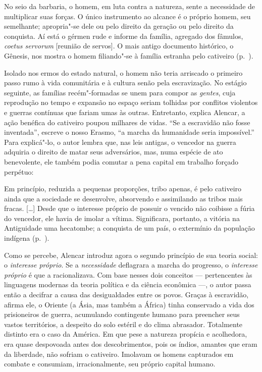 \begin{hedraquote}
No seio da barbaria, o homem, em luta contra a natureza, sente a
necessidade de multiplicar suas forças. O único instrumento ao alcance
é o próprio homem, seu semelhante; apropria"-se dele ou pelo direito
da geração ou pelo direito da conquista. Aí está o gérmen rude e
informe da família, agregado dos fâmulos, \textit{coetus servorum}
[reunião de servos]. O mais antigo documento histórico, o Gênesis, nos
mostra o homem filiando"-se à  família estranha pelo cativeiro
(p.~\pageref{barbaria}). 
\end{hedraquote}

Isolado nos ermos do estado natural, o homem não teria arriscado o
primeiro passo rumo à  vida comunitária e à  cultura senão pela
escravização. No estágio seguinte, as famílias recém"-formadas se unem
para compor as \textit{gentes}, cuja reprodução no tempo e expansão no
espaço seriam tolhidas por conflitos violentos e guerras contínuas que
fariam umas às outras. Entretanto, explica Alencar, a ação benéfica do
cativeiro poupou milhares de vidas. ``Se a escravidão não fosse
inventada'', escreve o nosso Erasmo, ``a marcha da humanidade seria
impossível.'' Para explicá"-lo, o autor lembra que, nas leis antigas, o
vencedor na guerra adquiria o direito de matar seus adversários, mas,
numa espécie de ato benevolente, ele também podia comutar a pena
capital em trabalho forçado perpétuo: 

\begin{hedraquote}
Em princípio, reduzida a pequenas proporções, tribo apenas, é pelo
cativeiro ainda que a sociedade se desenvolve, absorvendo e assimilando
as tribos mais fracas. [\ldots] 
Desde que o interesse próprio de possuir o vencido não coibisse a fúria
do vencedor, ele havia de imolar a vítima. Significara, portanto, a
vitória na Antiguidade uma hecatombe; a conquista de um país, o
extermínio da população indígena (p.~\pageref{hecatombe}). 
\end{hedraquote}

Como se percebe, Alencar introduz agora o segundo princípio de sua
teoria social: o \textit{interesse próprio}. Se a \textit{necessidade}
deflagrara a marcha do progresso, o \textit{interesse próprio} é que a
racionalizava. Com base nesses dois conceitos --- pertencentes às
linguagens modernas da teoria política e da ciência econômica ---, o
autor passa então a decifrar a causa das desigualdades entre os povos.
Graças à  escravidão, afirma ele, o Oriente (a Ásia, mas também a
África) tinha conservado a vida dos prisioneiros de guerra, acumulando
contingente humano para preencher seus vastos territórios, a despeito
do solo estéril e do clima abrasador. Totalmente distinto era o caso da
América. Em que pese a natureza propícia e acolhedora, era quase
despovoada antes dos descobrimentos, pois os índios, amantes que eram
da liberdade, não sofriam o cativeiro. Imolavam os homens capturados em
combate e consumiam, irracionalmente, seu próprio capital humano. 

